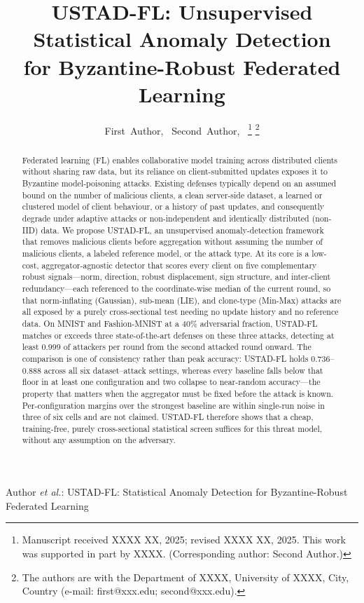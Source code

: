 \documentclass[journal]{IEEEtran}
\begin{document}
\title{USTAD-FL: Unsupervised Statistical Anomaly Detection\\for Byzantine-Robust Federated Learning}

\author{First~Author,~
Second~Author,~
\thanks{Manuscript received XXXX XX, 2025; revised XXXX XX, 2025. This work was supported in part by XXXX. (Corresponding author: Second Author.)}
\thanks{The authors are with the Department of XXXX, University of XXXX, City, Country (e-mail: first@xxx.edu; second@xxx.edu).}}

{Author \MakeLowercase{\textit{et al.}}: USTAD-FL: Statistical Anomaly Detection for Byzantine-Robust Federated Learning}

\maketitle

\begin{abstract}
Federated learning (FL) enables collaborative model training across distributed clients without sharing raw data, but its reliance on client-submitted updates exposes it to Byzantine model-poisoning attacks. Existing defenses typically depend on an assumed bound on the number of malicious clients, a clean server-side dataset, a learned or clustered model of client behaviour, or a history of past updates, and consequently degrade under adaptive attacks or non-independent and identically distributed (non-IID) data. We propose USTAD-FL, an unsupervised anomaly-detection framework that removes malicious clients before aggregation without assuming the number of malicious clients, a labeled reference model, or the attack type. At its core is a low-cost, aggregator-agnostic detector that scores every client on five complementary robust signals---norm, direction, robust displacement, sign structure, and inter-client redundancy---each referenced to the coordinate-wise median of the current round, so that norm-inflating (Gaussian), sub-mean (LIE), and clone-type (Min-Max) attacks are all exposed by a purely cross-sectional test needing no update history and no reference data. On MNIST and Fashion-MNIST at a $40\%$ adversarial fraction, USTAD-FL matches or exceeds three state-of-the-art defenses on these three attacks, detecting at least $0.999$ of attackers per round from the second attacked round onward. The comparison is one of consistency rather than peak accuracy: USTAD-FL holds $0.736$--$0.888$ across all six dataset--attack settings, whereas every baseline falls below that floor in at least one configuration and two collapse to near-random accuracy---the property that matters when the aggregator must be fixed before the attack is known. Per-configuration margins over the strongest baseline are within single-run noise in three of six cells and are not claimed. USTAD-FL therefore shows that a cheap, training-free, purely cross-sectional statistical screen suffices for this threat model, without any assumption on the adversary.
\end{abstract}
\end{document}
